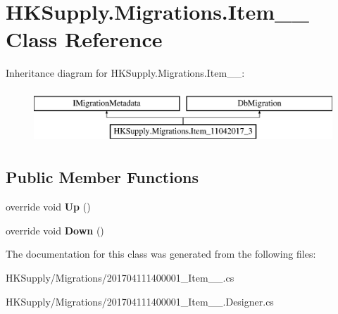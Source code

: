 \hypertarget{class_h_k_supply_1_1_migrations_1_1_item__11042017__3}{}\section{H\+K\+Supply.\+Migrations.\+Item\+\_\+\_ Class Reference}
\label{class_h_k_supply_1_1_migrations_1_1_item__11042017__3}
Inheritance diagram for H\+K\+Supply.\+Migrations.\+Item\+\_\+\_\+:\begin{figure}[H]
\begin{center}
\leavevmode
\includegraphics[height=2.000000cm]{class_h_k_supply_1_1_migrations_1_1_item__11042017__3}
\end{center}
\end{figure}
\subsection*{Public Member Functions}
\begin{DoxyCompactItemize}
\item 
\mbox{\label{class_h_k_supply_1_1_migrations_1_1_item__11042017__3_a00ee264fb6e12cccaf7ab58b5c5d0809}} 
override void {\bfseries Up} ()
\item 
\mbox{\label{class_h_k_supply_1_1_migrations_1_1_item__11042017__3_a9c1183211bc8a8cf3728f425344107fa}} 
override void {\bfseries Down} ()
\end{DoxyCompactItemize}


The documentation for this class was generated from the following files\+:\begin{DoxyCompactItemize}
\item 
H\+K\+Supply/\+Migrations/201704111400001\+\_\+\+Item\+\_\+\_.\+cs\item 
H\+K\+Supply/\+Migrations/201704111400001\+\_\+\+Item\+\_\+\_.\+Designer.\+cs\end{DoxyCompactItemize}
